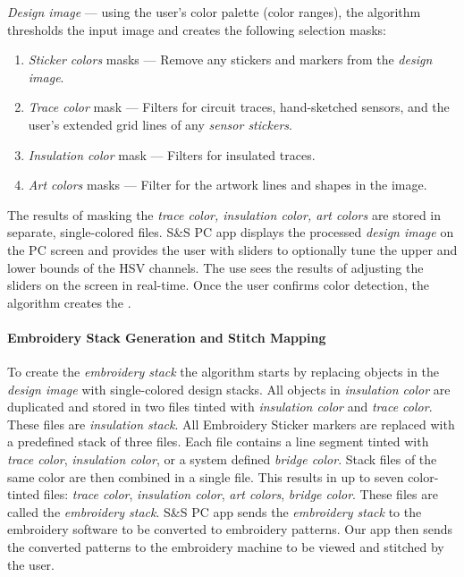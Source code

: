 \textit{Design image} --- using the user's color palette (color ranges), the algorithm thresholds the input image and creates the following selection masks: 
\begin{enumerate}
    \item \textit{Sticker colors} masks --- Remove any stickers and markers from the \textit{design image}. %
    \item \textit{Trace color} mask --- Filters for circuit traces, hand-sketched sensors, and the user's extended grid lines of any \textit{sensor stickers}. %
    \item \textit{Insulation color} mask --- Filters for insulated traces.
    \item \textit{Art colors} masks --- Filter for the artwork lines and shapes in the image.
\end{enumerate}
The results of masking the \textit{trace color, insulation color, art colors} are stored in separate, single-colored files. S\&S PC app displays the processed \textit{design image} on the PC screen and provides the user with sliders to optionally tune the upper and lower bounds of the HSV channels. The use sees the results of adjusting the sliders on the screen in real-time. Once the user confirms color detection, the algorithm creates the .

\paragraph{Embroidery Stack Generation and Stitch Mapping}
To create the \textit{embroidery stack} the algorithm starts by replacing objects in the \textit{design image} with single-colored design stacks. All objects in \textit{insulation color} are duplicated and stored in two files tinted with \textit{insulation color} and \textit{trace color}. These files are \textit{insulation stack}. All Embroidery Sticker markers are replaced with a predefined stack of three files. Each file contains a line segment tinted with \textit{trace color}, \textit{insulation color}, or a system defined \textit{bridge color}. Stack files of the same color are then combined in a single file. This results in up to seven color-tinted files: \textit{trace color}, \textit{insulation color}, \textit{art colors}, \textit{bridge color}. These files are called the \textit{embroidery stack}. S\&S PC app sends the \textit{embroidery stack} to the embroidery software to be converted to embroidery patterns. Our app then sends the converted patterns to the embroidery machine to be viewed and stitched by the user.





